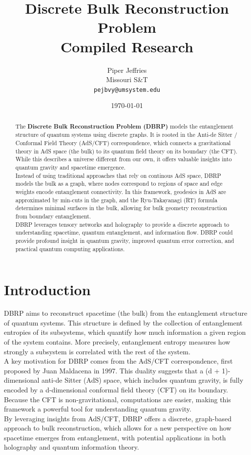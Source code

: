 \documentclass[12pt]{article}
\title{\textbf{Discrete Bulk Reconstruction Problem} \\ \large Compiled Research}
\author{Piper Jeffries \\ Missouri S\&T \\ \texttt{pejbvy@umsystem.edu}}
\date{\today}
\begin{document}
\maketitle

\begin{abstract}
    The \textbf{Discrete Bulk Reconstruction Problem (DBRP)} models the entanglement structure of quantum systems using discrete graphs. It is rooted in the Anti-de Sitter / Conformal Field Theory (AdS/CFT) correspondence, which connects a gravitational theory in AdS space (the bulk) to its quantum field theory on its boundary (the CFT).
    While this describes a universe different from our own, it offers valuable insights into quantum gravity and spacetime emergence. 
    \\
    \indent Instead of using traditional approaches that rely on continous AdS space, DBRP models the bulk as a graph, where nodes correspond to regions of space and edge weights encode entanglement connectivity.
    In this framework, geodesics in AdS are approximated by min-cuts in the graph, and the Ryu-Takayanagi (RT) formula determines minimal surfaces in the bulk, allowing for bulk geometry reconstruction from boundary entanglement.
    \\
   \indent DBRP leverages tensory networks and holography to provide a discrete approach to understanding spacetime, quantum entanglement, and information flow.
    DBRP could provide profound insight in quantum gravity, improved quantum error correction, and practical quantum computing applications.
\end{abstract}

\newpage 
\tableofcontents
\newpage

\section{Introduction}
    \hspace{0.5cm} DBRP aims to reconstruct spacetime (the bulk) from the entanglement structure of quantum systems. This structure is defined by the collection of entanglement entropies of its subsystems, which quantify how much information a given region of the system contains. More precisely, entanglement entropy measures how strongly a subsystem is correlated with the rest of the system.
    \\
    \indent A key motivation for DBRP comes from the AdS/CFT correspondence, first proposed by Juan Maldacena in 1997. This duality suggests that a (d + 1)-dimensional anti-de Sitter (AdS) space, which includes quantum gravity, is fully encoded by a d-dimensional conformal field theory (CFT) on its boundary. Because the CFT is non-gravitational, computations are easier, making this framework a powerful tool for understanding quantum gravity.
    \\
    \indent By leveraging insights from AdS/CFT, DBRP offers a discrete, graph-based approach to bulk reconstruction, which allows for a new perspective on how spacetime emerges from entanglement, with potential applications in both holography and quantum information theory.
\end{document}
